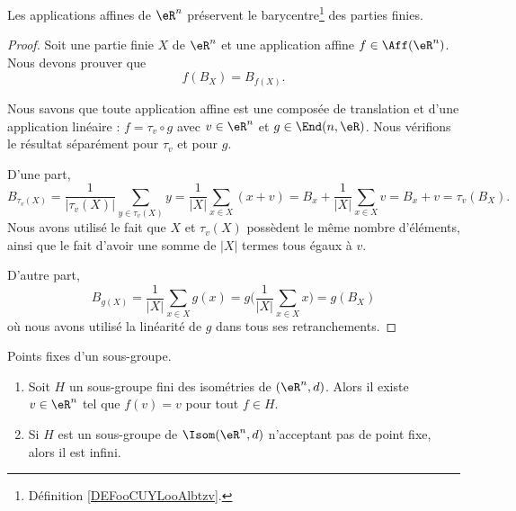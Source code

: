 \begin{lemma}        \label{LEMooSEZYooYceLIb}
	Les applications affines de \( \eR^n\) préservent le barycentre\footnote{Définition \ref{DEFooCUYLooAlbtzv}.} des parties finies.
\end{lemma}

\begin{proof}
	Soit une partie finie \( X\) de \( \eR^n\) et une application affine \( f\in\Aff(\eR^n)\). Nous devons prouver que
	\begin{equation}
		f(B_X)=B_{f(X)}.
	\end{equation}

	Nous savons que toute application affine est une composée de translation et d'une application linéaire : \( f=\tau_v\circ g\) avec \( v\in \eR^n\) et \( g\in \End(n,\eR)\). Nous vérifions le résultat séparément pour \( \tau_v\) et pour \( g\).

	D'une part,
	\begin{equation}
		B_{\tau_v(X)}=\frac{1}{ | \tau_v(X) | }\sum_{y\in \tau_v(X)}y=\frac{1}{ | X | }\sum_{x\in X}(x+v)=B_x+\frac{1}{ | X | }\sum_{x\in X}v=B_x+v=\tau_v(B_X).
	\end{equation}
	Nous avons utilisé le fait que \( X\) et \( \tau_v(X)\) possèdent le même nombre d'éléments, ainsi que le fait d'avoir une somme de \( | X |\) termes tous égaux à \( v\).

	D'autre part,
	\begin{equation}
		B_{g(X)}=\frac{1}{ | X | }\sum_{x\in X}g(x)=g\big( \frac{1}{ |X | }\sum_{x\in X}x \big)=g(B_X)
	\end{equation}
	où nous avons utilisé la linéarité de \( g\) dans tous ses retranchements.
\end{proof}

\begin{proposition}     \label{PROPooLAEBooWdcBoe}
	Points fixes d'un sous-groupe.
	\begin{enumerate}
		\item
		      Soit \( H\) un sous-groupe fini des isométries de \( (\eR^n,d)\). Alors il existe \( v\in \eR^n\) tel que \( f(v)=v\) pour tout \( f\in H\).
		\item
		      Si \( H\) est un sous-groupe de \( \Isom(\eR^n,d)\) n'acceptant pas de point fixe, alors il est infini.
	\end{enumerate}
\end{proposition}

